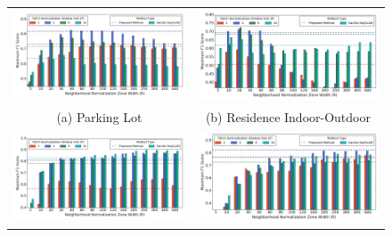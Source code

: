 \documentclass[letterpaper, 10 pt, conference]{ieeeconf}  %
\begin{document}
\begin{figure}
\centering
 \begin{tabular*}{\textwidth}[t]{cc}
\includegraphics[scale=0.28]{RPerformanceBar_parking_amrapali} &
\includegraphics[scale=0.28]{RPerformanceBar_home-indoor-outdoor} \\
(a) Parking Lot & (b) Residence Indoor-Outdoor \\
\includegraphics[scale=0.28]{RPerformanceBar_cta-rail} &
\includegraphics[scale=0.28]{RPerformanceBar_indoor-outdoor}\\

\end{tabular*}
\end{figure}
\end{document}
